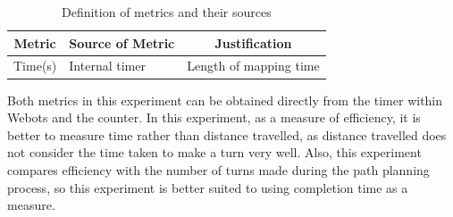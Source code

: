 \documentclass[conference]{IEEEtran}
\begin{document}
\begin{table}[htbp]
\centering
\caption{Definition of metrics and their sources}
\label{Table1}
\begin{tabular}{c|l|c}
\hline
Metric                & \multicolumn{1}{c|}{Source of Metric} & Justification     \\ \hline
Time(s)               & Internal timer            & Length of mapping time \\ \hline
\end{tabular}
\end{table}

Both metrics in this experiment can be obtained directly from the timer within Webots and the counter. In this experiment, as a measure of efficiency, it is better to measure time rather than distance travelled, as distance travelled does not consider the time taken to make a turn very well. Also, this experiment compares efficiency with the number of turns made during the path planning process, so this experiment is better suited to using completion time as a measure.
\end{document}
